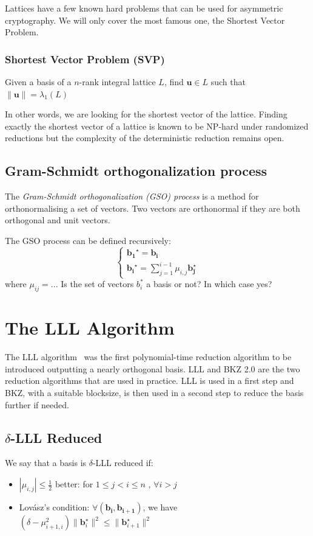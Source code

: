 \documentclass[10pt, a4paper]{article}
\newcommand{\my}[1]{{\color{blue} #1 }}
\renewcommand{\vec}[1]{\mathbf{#1}}
\begin{document}
Lattices have a few known hard problems that can be used for asymmetric cryptography. We will only cover the most famous one, the Shortest Vector Problem.

\subsubsection{Shortest Vector Problem (SVP)}

Given a basis of a $n$-rank integral lattice $L$, find $\vec{u} \in L$ such that $\|\vec{u}\| = \lambda_1 (L)$

In other words, we are looking for the shortest vector of the lattice. Finding exactly the shortest vector of a lattice is known to be NP-hard under randomized reductions\cite{Ajtai:1998:SVP} but the complexity of the deterministic reduction remains open.

\subsection{Gram-Schmidt orthogonalization process}
The \emph{Gram-Schmidt orthogonalization (\emph GSO) process} is a method for orthonormalising a set of vectors. Two vectors are orthonormal if they are both orthogonal and unit vectors. 

The GSO process  can be defined recursively:
\[
\begin{cases}
\vec{b_1}^{\star} = \vec{b_i}  \\
\vec{b_i}^{\star} = \displaystyle\sum^{i-1}_{j=1} \mu_{i,j} \vec{b_j^\star}
\end{cases}
\]
where \my{$\mu_{ij} = ..$. Is the set of vectors $b_i^*$ a basis or not? In which case yes?}

\section{The LLL Algorithm}

The LLL algorithm~\cite{lllpaper} was the first polynomial-time reduction algorithm to be introduced outputting a nearly orthogonal basis. LLL and BKZ 2.0 are the two reduction algorithms that are used in practice. LLL is used in a first step and BKZ, with a suitable blocksize, is then used in a second step to reduce the basis further if needed.

\subsection{$\delta$-LLL Reduced}
We say that a basis is $\delta$-LLL reduced if:
\begin{itemize}
\item $| \mu_{i,j}| \leq \frac{1}{2} $ \my{better: for $1 \leq j < i \leq	n$}$\text{, } \forall i > j$
\item Lovász's condition: $\forall (\vec{b_i, b_{i+1}})$, we have $(\delta - \mu^2_{i+1,i}) \|\vec{b}^{\star}_{i}\|^2 \leq \| \vec{b}^{\star}_{i+1} \|^2$
\end{itemize}
\end{document}
